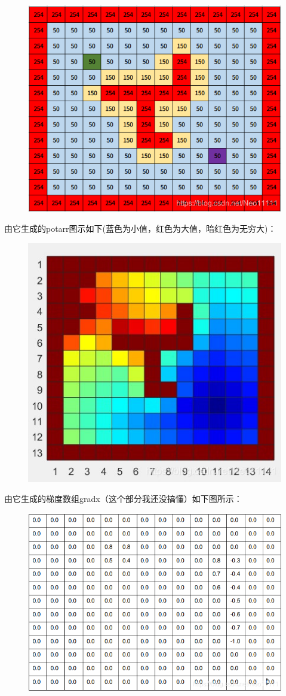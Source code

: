 \documentclass[9pt, oneside]{book}
\begin{document}
\begin{figure}[H]
    \centering
    \includegraphics[width=0.7\linewidth]{image/example_costmap.png}
\end{figure}

由它生成的potarr图示如下(蓝色为小值，红色为大值，暗红色为无穷大)：

\begin{figure}[H]
    \centering
    \includegraphics[width=0.7\linewidth]{image/example_potarr.jpg}
\end{figure}

由它生成的梯度数组gradx（这个部分我还没搞懂）如下图所示：

\begin{figure}[H]
    \centering
    \includegraphics[width=0.7\linewidth]{image/example_gradx.png}
\end{figure}
\end{document}
